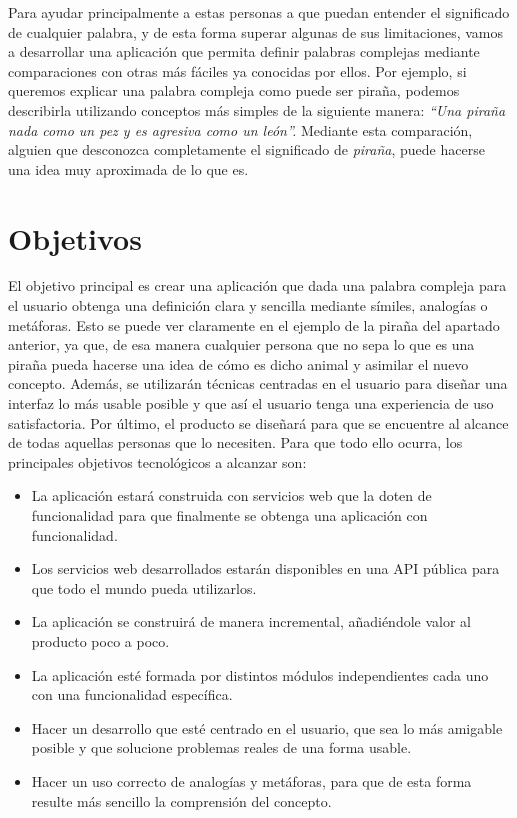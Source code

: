 Para ayudar principalmente a estas personas a que puedan entender el significado de cualquier palabra, y de esta forma superar algunas de sus limitaciones, vamos a desarrollar una aplicación que permita definir palabras complejas mediante comparaciones con otras más fáciles ya conocidas por ellos. Por ejemplo, si queremos explicar una palabra compleja como puede ser piraña, podemos describirla utilizando conceptos más simples de la siguiente manera:\textit{ ``Una piraña nada como un pez y es agresiva como un león''.} Mediante esta comparación, alguien que desconozca completamente el significado de \textit{piraña}, puede hacerse una idea muy aproximada de lo que es.


\section{Objetivos}
\label{cap:sec:objetivos}

El objetivo principal es crear una aplicación que dada una palabra compleja para el usuario obtenga una definición clara y sencilla mediante símiles, analogías o metáforas. 
Esto se puede ver claramente en el ejemplo de la piraña del apartado anterior, ya que, de esa manera cualquier persona que no sepa lo que es una piraña pueda hacerse una idea de cómo es dicho animal y asimilar el nuevo concepto. Además, se utilizarán técnicas centradas en el usuario para diseñar una interfaz lo más usable posible y que así el usuario tenga una experiencia de uso satisfactoria. Por último, el producto se diseñará para que se encuentre al alcance de todas aquellas personas que lo necesiten.
 Para que todo ello ocurra, los principales objetivos tecnológicos a alcanzar son:
\begin{itemize}
	\item La aplicación estará construida con servicios web que la doten de funcionalidad para que finalmente se obtenga una aplicación con funcionalidad. 
	\item Los servicios web desarrollados estarán disponibles en una API pública para que todo el mundo pueda utilizarlos.	
	\item La aplicación se construirá de manera incremental, añadiéndole valor al producto poco a poco.	
	\item La aplicación esté formada por distintos módulos independientes cada uno con una funcionalidad específica.
	\item Hacer un desarrollo que esté centrado en el usuario, que sea lo más amigable posible y que solucione problemas reales de una forma usable.
	\item Hacer un uso correcto de analogías y metáforas, para que de esta forma resulte más sencillo la comprensión del concepto.
\end{itemize}

